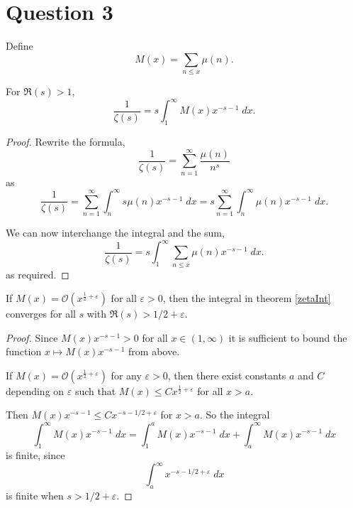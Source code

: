 \documentclass{unswmaths}
\begin{document}
\section*{Question 3}
Define
\begin{equation*}
    M(x) = \sum_{n\leq x} \mu(n).
\end{equation*}
\begin{theorem} 
\label{zetaInt}
    For $\Re(s) > 1$,
    \begin{equation*}
        \frac{1}{\zeta(s)} = s\int_{1}^\infty M(x)x^{-s-1}\;dx.
    \end{equation*}
\end{theorem}
\begin{proof}
    Rewrite the formula,
    \begin{equation*}
        \frac{1}{\zeta(s)} = \sum_{n=1}^\infty \frac{\mu(n)}{n^s}
    \end{equation*}
    as
    \begin{equation*}
        \frac{1}{\zeta(s)} = \sum_{n=1}^\infty \int_{n}^\infty s\mu(n)x^{-s-1}\;dx = s\sum_{n=1}^\infty \int_{n}^\infty \mu(n)x^{-s-1}\;dx.
    \end{equation*}
    
    We can now interchange the integral and the sum, 
    \begin{equation*}
        \frac{1}{\zeta(s)} = s\int_{1}^\infty \sum_{n\leq x} \mu(n) x^{-s-1}\;dx.
    \end{equation*}
    as required.
\end{proof}
\begin{lemma}
    If $M(x) = \mathcal{O}(x^{\frac{1}{2}+\varepsilon})$ for all $\varepsilon > 0$, then
    the integral in theorem \ref{zetaInt} converges for all $s$ with $\Re(s) > 1/2+\varepsilon$.
\end{lemma}
\begin{proof}
    Since $M(x)x^{-s-1} > 0$ for all $x \in (1,\infty)$ it is sufficient to bound the
    function $x\mapsto M(x)x^{-s-1}$ from above.
    
    If $M(x) = \mathcal{O}(x^{\frac{1}{2}+\varepsilon})$ for any $\varepsilon > 0$,
    then there exist constants $a$ and $C$ depending on $\varepsilon$
    such that $M(x) \leq Cx^{\frac{1}{2}+\varepsilon}$ for all $x > a$. 
   
    Then $M(x)x^{-s-1} \leq Cx^{-s-1/2+\varepsilon}$ for $x > a$. So the integral
    \begin{equation*}
        \int_{1}^\infty M(x)x^{-s-1}\;dx = \int_{1}^a M(x)x^{-s-1}\;dx+\int_{a}^\infty M(x)x^{-s-1}\;dx
    \end{equation*}    
    is finite, since
    \begin{equation*}
        \int_{a}^\infty x^{-s-1/2+\varepsilon}\;dx
    \end{equation*}
    is finite when $s > 1/2+\varepsilon$.
\end{proof}
\end{document}
